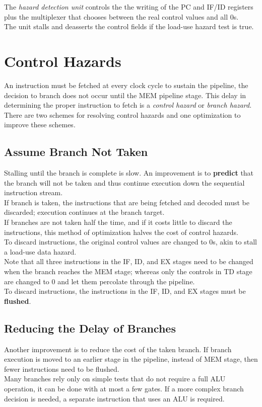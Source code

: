 \documentclass[12pt]{article}
\theoremstyle{definition}
\begin{document}
  The \emph{hazard detection unit} controls the the writing of the PC and IF/ID registers plus the multiplexer that chooses between the real control values and all 0s. \\
  The unit stalls and deasserts the control fields if the load-use hazard test is true.

  \section{Control Hazards} %
  An instruction must be fetched at every clock cycle to sustain the pipeline, the decision to branch does not occur until the MEM pipeline stage.
  This delay in determining the proper instruction to fetch is a \emph{control hazard} or \emph{branch hazard}. \\
  There are two schemes for resolving control hazards and one optimization to improve these schemes.
  \subsection{Assume Branch Not Taken}
  Stalling until the branch is complete is slow.
  An improvement is to \textbf{predict} that the branch will not be taken and thus continue execution down the sequential instruction stream. \\
  If branch is taken, the instructions that are being fetched and decoded must be discarded;
  execution continues at the branch target. \\
  If branches are not taken half the time, and if it costs little to discard the instructions, this method of optimization halves the cost of control hazards. \\

  To discard instructions, the original control values are changed to 0s, akin to stall a load-use data hazard. \\
  Note that all three instructions in the IF, ID, and EX stages need to be changed when the branch reaches the MEM stage;
  whereas only the controls in TD stage are changed to 0 and let them percolate through the pipeline. \\
  To discard instructions, the instructions in the IF, ID, and EX stages must be \textbf{flushed}.

  \subsection{Reducing the Delay of Branches}
  Another improvement is to reduce the cost of the taken branch.
  If branch execution is moved to an earlier stage in the pipeline, instead of MEM stage, then fewer instructions need to be flushed. \\
  Many branches rely only on simple tests that do not require a full ALU operation, it can be done with at most a few gates.
  If a more complex branch decision is needed, a separate instruction that uses an ALU is required. \\
\end{document}
